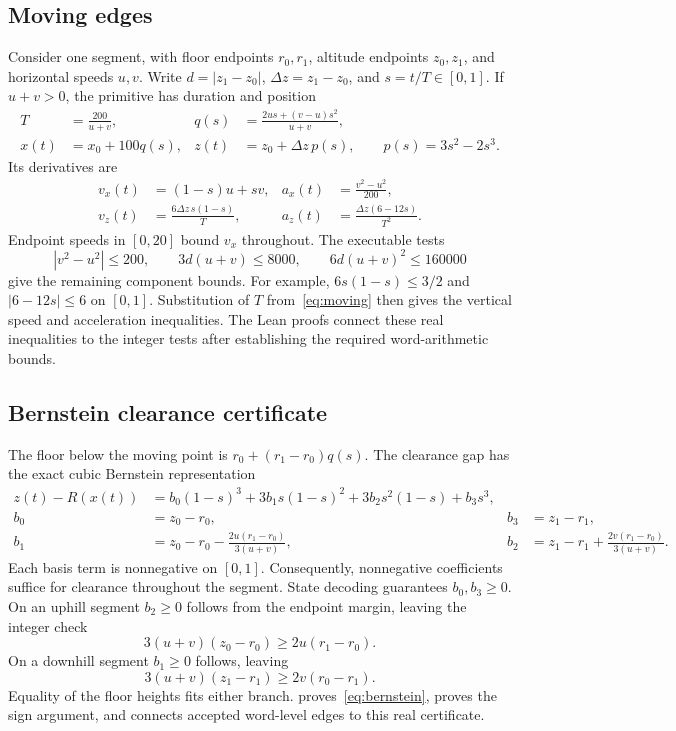\documentclass[11pt]{article}
\begin{document}
\subsection{Moving edges}

Consider one segment, with floor endpoints $r_0,r_1$, altitude endpoints $z_0,z_1$, and horizontal speeds $u,v$.  Write $d=|z_1-z_0|$, $\Delta z=z_1-z_0$, and $s=t/T\in[0,1]$.  If $u+v>0$, the primitive has duration and position
\begin{align}
 T&=\frac{200}{u+v},&
 q(s)&=\frac{2us+(v-u)s^2}{u+v},\label{eq:moving}\\
 x(t)&=x_0+100q(s),&
 z(t)&=z_0+\Delta z\,p(s),\qquad p(s)=3s^2-2s^3.
\end{align}
Its derivatives are
\begin{align}
 v_x(t)&=(1-s)u+sv,& a_x(t)&=\frac{v^2-u^2}{200},\\
 v_z(t)&=\frac{6\Delta z\,s(1-s)}{T},&
 a_z(t)&=\frac{\Delta z(6-12s)}{T^2}.
\end{align}
Endpoint speeds in $[0,20]$ bound $v_x$ throughout.  The executable tests
\begin{equation}
 |v^2-u^2|\leq200,\qquad
 3d(u+v)\leq8000,\qquad
 6d(u+v)^2\leq160000
 \label{eq:guards}
\end{equation}
give the remaining component bounds.  For example, $6s(1-s)\leq3/2$ and $|6-12s|\leq6$ on $[0,1]$.  Substitution of $T$ from~\eqref{eq:moving} then gives the vertical speed and acceleration inequalities.  The Lean proofs connect these real inequalities to the integer tests after establishing the required word-arithmetic bounds.

\subsection{Bernstein clearance certificate}

The floor below the moving point is $r_0+(r_1-r_0)q(s)$.  The clearance gap has the exact cubic Bernstein representation
\begin{align}
 z(t)-R(x(t))
 &=b_0(1-s)^3+3b_1s(1-s)^2+3b_2s^2(1-s)+b_3s^3,\label{eq:bernstein}\\
 b_0&=z_0-r_0,& b_3&=z_1-r_1,\nonumber\\
 b_1&=z_0-r_0-\frac{2u(r_1-r_0)}{3(u+v)},&
 b_2&=z_1-r_1+\frac{2v(r_1-r_0)}{3(u+v)}.\nonumber
\end{align}
Each basis term is nonnegative on $[0,1]$.  Consequently, nonnegative coefficients suffice for clearance throughout the segment.  State decoding guarantees $b_0,b_3\geq0$.  On an uphill segment $b_2\geq0$ follows from the endpoint margin, leaving the integer check
\[
 3(u+v)(z_0-r_0)\geq2u(r_1-r_0).
\]
On a downhill segment $b_1\geq0$ follows, leaving
\[
 3(u+v)(z_1-r_1)\geq2v(r_0-r_1).
\]
Equality of the floor heights fits either branch.   proves~\eqref{eq:bernstein},  proves the sign argument, and  connects accepted word-level edges to this real certificate.
\end{document}

